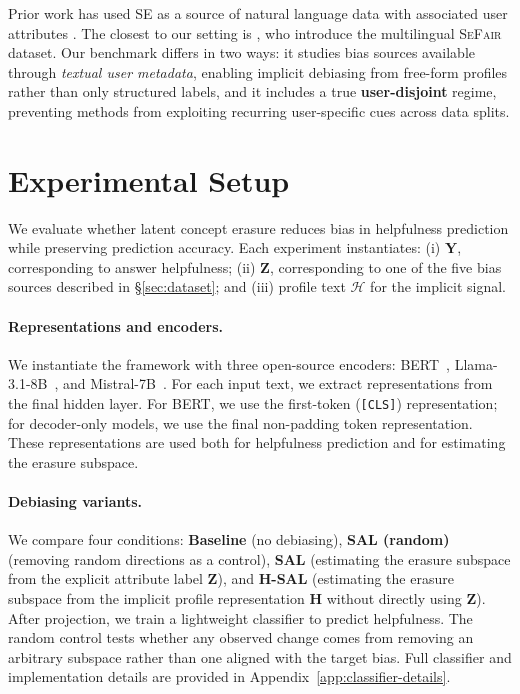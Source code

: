 \documentclass[11pt]{article}
\newcommand{\rv}[1]{\mathbf{#1}}
\begin{document}
Prior work has used SE as a source of natural language data with associated user attributes \cite[\emph{inter alia}]{rao-daume-iii-2018-learning,brooke2019condescending,hazoom-etal-2021-text}. The closest to our setting is \citet{shao-etal-2025-iterative}, who introduce the multilingual \textsc{SeFair} dataset. Our benchmark differs in two ways: it studies bias sources available through \emph{textual user metadata}, enabling implicit debiasing from free-form profiles rather than only structured labels, and it includes a true \textbf{user-disjoint} regime, preventing methods from exploiting recurring user-specific cues across data splits. 




\section{Experimental Setup}
\label{sec:exp-setup}



We evaluate whether latent concept erasure reduces bias in helpfulness prediction while preserving prediction accuracy. Each experiment instantiates: (i) $\rv{Y}$, corresponding to answer helpfulness; (ii)  $\rv{Z}$, corresponding to one of the five bias sources described in \S\ref{sec:dataset}; and (iii) profile text $\mathcal{H}$ for the implicit signal. %




\paragraph{Representations and encoders.}
We instantiate the framework with three open-source encoders: BERT~\citep{devlin-etal-2019-bert}, Llama-3.1-8B~\citep{grattafiori2024llama3herdmodels}, and Mistral-7B~\citep{jiang2023mistral7b}. For each input text, we extract representations from the final hidden layer. For BERT, we use the first-token (\texttt{[CLS]}) representation; for decoder-only models, we use the final non-padding token representation. These representations are used both for helpfulness prediction and for estimating the erasure subspace.



\paragraph{Debiasing variants.}
We compare four conditions: \textbf{Baseline} (no debiasing), \textbf{SAL (random)} (removing random directions as a control), \textbf{SAL} (estimating the erasure subspace from the explicit attribute label $\rv{Z}$), and \textbf{H-SAL} (estimating the erasure subspace from the implicit profile representation $\rv{H}$ without directly using $\rv{Z}$). After projection, we train a lightweight classifier to predict helpfulness. The random control tests whether any observed change comes from removing an arbitrary subspace rather than one aligned with the target bias. Full classifier and implementation details are provided in Appendix~\ref{app:classifier-details}.
\end{document}
